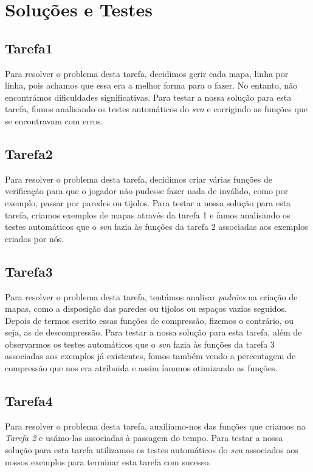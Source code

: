 \documentclass[a4paper]{report}
\begin{document}
\section{Soluções e Testes}
\label{sec:solucoes}

\subsection{Tarefa1}

Para resolver o problema desta tarefa, decidimos gerir cada mapa, linha por linha, pois achamos que essa era a melhor forma para o fazer. No entanto, não encontrámos dificuldades significativas.
Para testar a nossa solução para esta tarefa, fomos analisando os testes automáticos do \emph{svn} e corrigindo as funções que se encontravam com erros.

\subsection{Tarefa2}

Para resolver o problema desta tarefa, decidimos criar várias funções de verificação para que o jogador não pudesse fazer nada de inválido, como por exemplo, passar por paredes ou tijolos.
Para testar a nossa solução para esta tarefa, criamos exemplos de mapas através da tarefa 1 e íamos analisando os testes automáticos que o \emph{svn} fazia às funções da tarefa 2 associadas aos exemplos criados por nós.

\subsection{Tarefa3}

Para resolver o problema desta tarefa, tentámos analisar \emph{padrões} na criação de mapas, como a disposição das paredes ou tijolos ou espaços vazios seguidos. Depois de termos escrito essas funções de compressão, fizemos o contrário, ou seja, as de descompressão.
Para testar a nossa solução para esta tarefa, além de observarmos os testes automáticos que o \emph{svn} fazia às funções da tarefa 3 associadas aos exemplos já existentes, fomos também vendo a percentagem de compressão que nos era atríbuida e assim íammos otimizando as funções. 

\subsection{Tarefa4}

Para resolver o problema desta tarefa, auxiliamo-nos das funções que criamos na \emph{Tarefa 2} e usámo-las associadas à passagem do tempo.
Para testar a nossa solução para esta tarefa utilizamos os testes automáticos do \emph{svn} associados aos nossos exemplos para terminar esta tarefa com sucesso.
\end{document}
